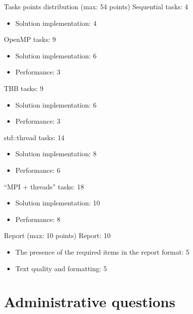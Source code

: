 \documentclass{beamer}
\begin{document}
\begin{frame}{Tasks points distribution (max: 54 points)}
    Sequential tasks: 4
    \begin{itemize}
        \item Solution implementation: 4
    \end{itemize}
    OpenMP tasks: 9
    \begin{itemize}
        \item Solution implementation: 6
        \item Performance: 3
    \end{itemize}
    TBB tasks: 9
    \begin{itemize}
        \item Solution implementation: 6
        \item Performance: 3
    \end{itemize}
    std::thread tasks: 14
    \begin{itemize}
        \item Solution implementation: 8
        \item Performance: 6
    \end{itemize}
    “MPI + threads” tasks: 18
    \begin{itemize}
        \item Solution implementation: 10
        \item Performance: 8
    \end{itemize}
\end{frame}

\begin{frame}{Report (max: 10 points)}
    Report: 10
    \begin{itemize}
        \item The presence of the required items in the report format: 5
        \item Text quality and formatting: 5
    \end{itemize}
\end{frame}

\section{Administrative questions}\label{sec:administrative-questions}
\end{document}
